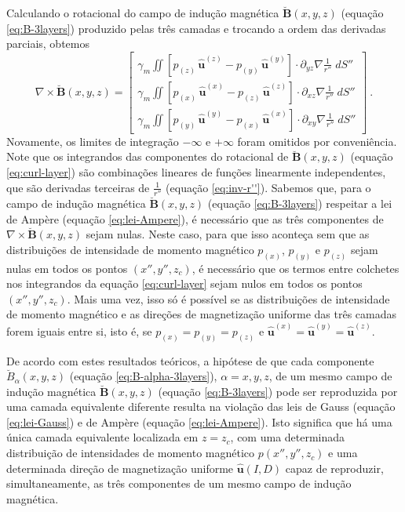 Calculando o rotacional do campo de indução magnética 
$\breve{\mathbf{B}}(x, y, z)$ (equação \ref{eq:B-3layers}) produzido pelas três camadas 
e trocando a ordem das derivadas parciais, obtemos
\begin{equation}
\nabla \times \breve{\mathbf{B}}(x, y, z) = \begin{bmatrix}
\gamma_{m} \iint
\left[ p_{(z)} \, \hat{\mathbf{u}}^{(z)} - p_{(y)} \, \hat{\mathbf{u}}^{(y)} \right] \cdot 
\partial_{yz} \nabla \frac{1}{r''} \; dS'' \\
\gamma_{m} \iint
\left[ p_{(x)} \, \hat{\mathbf{u}}^{(x)} - p_{(z)} \, \hat{\mathbf{u}}^{(z)} \right] \cdot 
\partial_{xz} \nabla \frac{1}{r''} \; dS'' \\
\gamma_{m} \iint
\left[ p_{(y)} \, \hat{\mathbf{u}}^{(y)} - p_{(x)} \, \hat{\mathbf{u}}^{(x)} \right] \cdot 
\partial_{xy} \nabla \frac{1}{r''} \; dS''
\end{bmatrix} \: .
\label{eq:curl-layer}
\end{equation}
Novamente, os limites de integração $-\infty$ e $+\infty$ foram omitidos por conveniência.
Note que os integrandos das componentes do rotacional de $\breve{\mathbf{B}}(x, y, z)$ 
(equação \ref{eq:curl-layer}) são combinações lineares de funções linearmente 
independentes, que são derivadas terceiras de $\frac{1}{r''}$ (equação \ref{eq:inv-r''}).
Sabemos que, para o campo de indução magnética $\breve{\mathbf{B}}(x, y, z)$ 
(equação \ref{eq:B-3layers}) respeitar a lei de Ampère (equação \ref{eq:lei-Ampere}), é necessário que as 
três componentes de $\nabla \times \breve{\mathbf{B}}(x, y, z)$ sejam nulas. 
Neste caso, para que isso aconteça sem que as distribuições de intensidade de momento magnético 
$p_{(x)}$, $p_{(y)}$ e $p_{(z)}$ sejam 
nulas em todos os pontos $(x'', y'', z_{c})$, é necessário que os termos entre colchetes
nos integrandos da equação \ref{eq:curl-layer} sejam nulos em todos os pontos $(x'', y'', z_{c})$.
Mais uma vez, isso só é possível se as distribuições de intensidade de momento magnético 
e as direções de magnetização uniforme das três camadas forem iguais entre si, isto é, se 
$p_{(x)} = p_{(y)} = p_{(z)}$ e 
$\hat{\mathbf{u}}^{(x)} = \hat{\mathbf{u}}^{(y)} = \hat{\mathbf{u}}^{(z)}$.

De acordo com estes resultados teóricos, a hipótese de que cada componente $\breve{B}_{\alpha}(x, y, z)$ 
(equação \ref{eq:B-alpha-3layers}), $\alpha = x, y, z$, de um mesmo campo de indução magnética $\breve{\mathbf{B}}(x, y, z)$ 
(equação \ref{eq:B-3layers}) pode ser reproduzida por uma camada equivalente diferente resulta na 
violação das leis de Gauss (equação \ref{eq:lei-Gauss}) e de Ampère (equação \ref{eq:lei-Ampere}).
Isto significa que há uma única camada equivalente localizada em $z = z_{c}$, 
com uma determinada distribuição de intensidades de momento magnético $p(x'', y'', z_{c})$ e uma 
determinada direção de magnetização uniforme $\hat{\mathbf{u}}(I, D)$ capaz de reproduzir, simultaneamente,
as três componentes de um mesmo campo de indução magnética.

